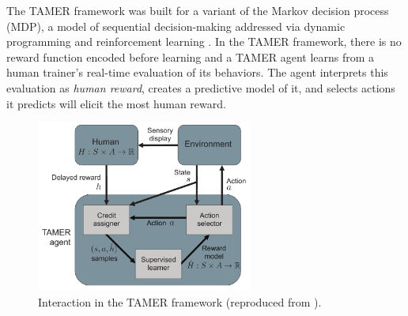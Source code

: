 \documentclass[10pt,journal,compsoc]{IEEEtran}
\begin{document}

The TAMER framework was built for a variant of the Markov decision process (MDP), a model of se\-quen\-tial de\-ci\-sion-making addressed via dynamic programming \cite{howard1960dynamic} and reinforcement learning \cite{sutton1998reinforcement}. In the TAMER framework, there is no reward function encoded before learning and a TAMER agent learns from a human trainer's real-time evaluation of its behaviors. The agent interprets this evaluation as \emph{human reward}, creates a predictive model of it, and selects actions it predicts will elicit the most human reward. 

\begin{figure} [ht]
\centering
\includegraphics[width=2.8in]{HumanAgentEnvConceptualDiagram}
\caption{Interaction in the TAMER framework (reproduced from \protect\cite{knox2012learning}). }
\label{HumanAgentEnvConceptualDiagram}
\end{figure}
\end{document}
